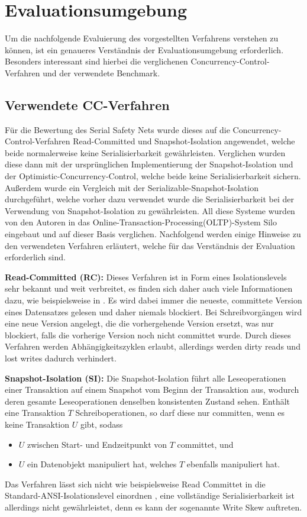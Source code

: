 \section{Evaluationsumgebung}
\label{sec:evaluation_umgebung}

Um die nachfolgende Evaluierung des vorgestellten Verfahrens verstehen zu können, ist ein genaueres Verständnis der Evaluationsumgebung erforderlich.
Besonders interessant sind hierbei die verglichenen Concurrency-Control-Verfahren und der verwendete Benchmark.

\subsection{Verwendete CC-Verfahren}
Für die Bewertung des Serial Safety Nets wurde dieses auf die Concurrency-Control-Verfahren Read-Committed und Snapshot-Isolation angewendet, welche beide normalerweise keine Serialisierbarkeit gewährleisten.
Verglichen wurden diese dann mit der ursprünglichen Implementierung der Snapshot-Isolation und der Optimistic-Concurrency-Control, welche beide keine Serialisierbarkeit sichern.
Außerdem wurde ein Vergleich mit der Serializable-Snapshot-Isolation durchgeführt, welche vorher dazu verwendet wurde die Serialisierbarkeit bei der Verwendung von Snapshot-Isolation zu gewährleisten.
All diese Systeme wurden von den Autoren in das Online-Transaction-Processing(OLTP)-System Silo eingebaut und auf dieser Basis verglichen.
Nachfolgend werden einige Hinweise zu den verwendeten Verfahren erläutert, welche für das Verständnis der Evaluation erforderlich sind.

\textbf{Read-Committed (RC):} Dieses Verfahren ist in Form eines Isolationslevels sehr bekannt und weit verbreitet, es finden sich daher auch viele Informationen dazu, wie beispielsweise in \cite{Berenson:1995}.
Es wird dabei immer die neueste, committete Version eines Datensatzes gelesen und daher niemals blockiert.
Bei Schreibvorgängen wird eine neue Version angelegt, die die vorhergehende Version ersetzt, was nur blockiert, falls die vorherige Version noch nicht committet wurde.
Durch dieses Verfahren werden Abhängigkeitszyklen erlaubt, allerdings werden dirty reads und lost writes \cite{Berenson:1995} dadurch verhindert.

\textbf{Snapshot-Isolation (SI):} Die Snapshot-Isolation führt alle Leseoperationen einer Transaktion auf einem Snapshot vom Beginn der Transaktion aus, wodurch deren gesamte Leseoperationen denselben konsistenten Zustand sehen.
Enthält eine Transaktion $T$ Schreiboperationen, so darf diese nur committen, wenn es keine Transaktion $U$ gibt, sodass 
\begin{itemize}
	\item $U$ zwischen Start- und Endzeitpunkt von $T$ committet, und
	\item $U$ ein Datenobjekt manipuliert hat, welches $T$ ebenfalls manipuliert hat.
\end{itemize}
Das Verfahren lässt sich nicht wie beispielsweise Read Committet in die Standard-ANSI-Isolationslevel einordnen \cite{Adya:2000}, eine vollständige Serialisierbarkeit ist allerdings nicht gewährleistet, denn es kann der sogenannte Write Skew auftreten.

